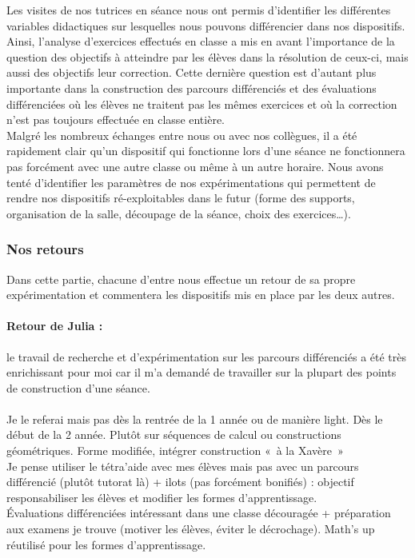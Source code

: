 Les visites de nos tutrices en séance nous ont permis d'identifier les différentes variables didactiques sur lesquelles nous pouvons différencier dans nos dispositifs. Ainsi, l'analyse d'exercices effectués en classe a mis en avant l'importance de la question des objectifs à atteindre par les élèves dans la résolution de ceux-ci, mais aussi des objectifs leur correction. Cette dernière question est d'autant plus importante dans la construction des parcours différenciés et des évaluations différenciées où les élèves ne traitent pas les mêmes exercices et où la correction n'est pas toujours effectuée en classe entière.\\
Malgré les nombreux échanges entre nous ou avec nos collègues, il a été rapidement clair qu'un dispositif qui fonctionne lors d'une séance ne fonctionnera pas forcément avec une autre classe ou même à un autre horaire. Nous avons tenté d'identifier les paramètres de nos expérimentations qui permettent de rendre nos dispositifs ré-exploitables dans le futur (forme des supports, organisation de la salle, découpage de la séance, choix des exercices\ldots).

\subsubsection{Nos retours}
Dans cette partie, chacune d'entre nous effectue un retour de sa propre expérimentation et commentera les dispositifs mis en place par les deux autres. \\
\paragraph*{Retour de Julia :}
le travail de recherche et d'expérimentation sur les parcours différenciés a été très enrichissant pour moi car il m'a demandé de travailler sur la plupart des points de construction d'une séance. \\
\\
Je le referai mais pas dès la rentrée de la 1 année ou de manière light. Dès le début de la 2 année. Plutôt sur séquences de calcul ou constructions géométriques. Forme modifiée, intégrer construction « à la Xavère »\\
Je pense utiliser le tétra'aide avec mes élèves mais pas avec un parcours différencié (plutôt tutorat là) + ilots (pas forcément bonifiés) : objectif responsabiliser les élèves et modifier les formes d'apprentissage.\\
Évaluations différenciées intéressant dans une classe découragée + préparation aux examens je trouve (motiver les élèves, éviter le décrochage).
Math's up réutilisé pour les formes d'apprentissage.


